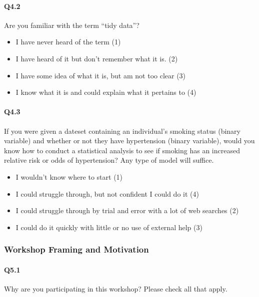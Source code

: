 \documentclass[030-workshop.tex]{subfiles}
\begin{document}
    \paragraph{Q4.2}

    Are you familiar with the term ``tidy data''?

    \begin{itemize}
        \item I have never heard of the term  (1)
        \item I have heard of it but don’t remember what it is.  (2)
        \item I have some idea of what it is, but am not too clear  (3)
        \item I know what it is and could explain what it pertains to  (4)
    \end{itemize}

    \paragraph{Q4.3}

    If you were given a dateset containing an individual's smoking status
    (binary variable) and whether or not they have hypertension (binary variable),
    would you know how to conduct a statistical analysis to see
    if smoking has an increased relative risk or odds of hypertension? Any
    type of model will suffice.

    \begin{itemize}
        \item I wouldn't know where to start  (1)
        \item I could struggle through, but not confident I could do it  (4)
        \item I could struggle through by trial and error with a lot of web searches  (2)
        \item I could do it quickly with little or no use of external help  (3)
    \end{itemize}

\subsubsection{Workshop Framing and Motivation}

    \paragraph{Q5.1}

        Why are you participating in this workshop? Please check all that apply.
\end{document}
